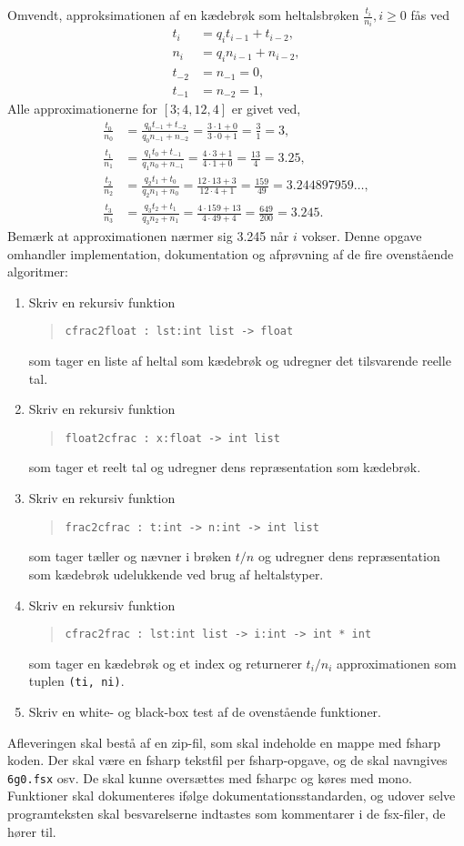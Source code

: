 \documentclass[a4paper,12pt]{article}
\begin{document}
Omvendt, approksimationen af en kædebrøk som heltalsbrøken $\frac{t_i}{n_i}, i \geq 0$ fås ved
\begin{align}
  t_i &= q_it_{i-1}+t_{i-2},
  \\n_i &= q_in_{i-1}+n_{i-2},
  \\t_{-2} &= n_{-1} = 0,
  \\t_{-1} &= n_{-2} =1,
\end{align}
Alle approximationerne for $[3; 4, 12, 4]$ er givet ved,
\begin{align}
  \frac{t_0}{n_0} &= \frac{q_0t_{-1} + t_{-2}}{q_0n_{-1}+n_{-2}} = \frac{3\cdot 1+0}{3\cdot 0 + 1} = \frac{3}{1} = 3,
  \\\frac{t_1}{n_1} &= \frac{q_1t_0 + t_{-1}}{q_1n_0+n_{-1}} = \frac{4\cdot 3 + 1}{4\cdot 1+0} = \frac{13}{4} = 3.25,
  \\\frac{t_2}{n_2} &= \frac{q_2t_1 + t_{0}}{q_2n_1+n_{0}} = \frac{12\cdot 13 + 3}{12\cdot 4 + 1} = \frac{159}{49} = 3.244897959\ldots,
  \\\frac{t_3}{n_3} &= \frac{q_3t_2 + t_{1}}{q_3n_2+n_{1}} = \frac{4\cdot 159 + 13}{4\cdot 49+4} = \frac{649}{200} = 3.245.
\end{align}
Bemærk at approximationen nærmer sig 3.245 når $i$ vokser.
\newpage
Denne opgave omhandler implementation, dokumentation og afprøvning af de fire ovenstående algoritmer:
\begin{enumerate}[label=6g.\arabic*,start=0]
\item Skriv en rekursiv funktion
  \begin{quote}
    \lstinline{cfrac2float : lst:int list -> float}
  \end{quote}
  som tager en liste af heltal som kædebrøk og udregner det tilsvarende reelle tal.
\item Skriv en rekursiv funktion
  \begin{quote}
    \lstinline{float2cfrac : x:float -> int list}
  \end{quote}
  som tager et reelt tal og udregner dens repræsentation som kædebrøk.
\item Skriv en rekursiv funktion
  \begin{quote}
    \lstinline{frac2cfrac : t:int -> n:int -> int list}
  \end{quote}
  som tager tæller og nævner i brøken $t/n$ og udregner dens repræsentation som kædebrøk udelukkende ved brug af heltalstyper.
\item Skriv en rekursiv funktion
  \begin{quote}
    \lstinline{cfrac2frac : lst:int list -> i:int -> int * int}
  \end{quote}
  som tager en kædebrøk og et index og returnerer $t_i/n_i$ approximationen som tuplen \lstinline{(ti, ni)}.
\item Skriv en white- og black-box test af de ovenstående funktioner.
\end{enumerate}
Afleveringen skal bestå af en zip-fil, som skal indeholde en mappe med fsharp koden. Der skal være en fsharp tekstfil per fsharp-opgave, og de skal navngives \verb|6g0.fsx| osv. De skal kunne oversættes med fsharpc og køres med mono. Funktioner skal dokumenteres ifølge dokumentationsstandarden, og udover selve programteksten skal besvarelserne indtastes som kommentarer i de fsx-filer, de hører til.
\end{document}
